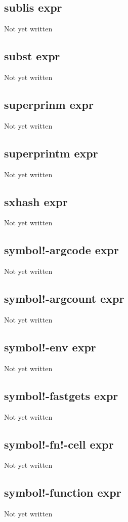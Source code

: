 \documentclass[a4paper,11pt]{article}
\begin{document}
\subsection{\ttfamily sublis expr}
Not yet written

\subsection{\ttfamily subst expr}
Not yet written

\subsection{\ttfamily superprinm expr}
Not yet written

\subsection{\ttfamily superprintm expr}
Not yet written

\subsection{\ttfamily sxhash expr}
Not yet written

\subsection{\ttfamily symbol!-argcode expr}
Not yet written

\subsection{\ttfamily symbol!-argcount expr}
Not yet written

\subsection{\ttfamily symbol!-env expr}
Not yet written

\subsection{\ttfamily symbol!-fastgets expr}
Not yet written

\subsection{\ttfamily symbol!-fn!-cell expr}
Not yet written

\subsection{\ttfamily symbol!-function expr}
Not yet written
\end{document}
